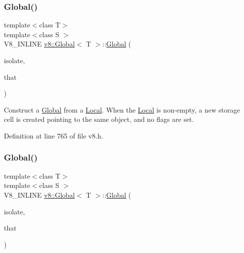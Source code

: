 \subsubsection{\texorpdfstring{Global()}{Global()}\hspace{0.1cm}{\footnotesize\ttfamily [2/4]}}
{\footnotesize\ttfamily template$<$class T$>$ \\
template$<$class S $>$ \\
V8\+\_\+\+I\+N\+L\+I\+NE \mbox{\hyperlink{classv8_1_1Global}{v8\+::\+Global}}$<$ T $>$\+::\mbox{\hyperlink{classv8_1_1Global}{Global}} (\begin{DoxyParamCaption}\item[{Isolate $\ast$}]{isolate,  }\item[{\mbox{\hyperlink{classv8_1_1Local}{Local}}$<$ S $>$}]{that }\end{DoxyParamCaption})\hspace{0.3cm}{\ttfamily [inline]}}

Construct a \mbox{\hyperlink{classv8_1_1Global}{Global}} from a \mbox{\hyperlink{classv8_1_1Local}{Local}}. When the \mbox{\hyperlink{classv8_1_1Local}{Local}} is non-\/empty, a new storage cell is created pointing to the same object, and no flags are set. 

Definition at line 765 of file v8.\+h.

\mbox{\label{classv8_1_1Global_a6243ecb28bb97d066065796fa28f7415}} 
\subsubsection{\texorpdfstring{Global()}{Global()}\hspace{0.1cm}{\footnotesize\ttfamily [3/4]}}
{\footnotesize\ttfamily template$<$class T$>$ \\
template$<$class S $>$ \\
V8\+\_\+\+I\+N\+L\+I\+NE \mbox{\hyperlink{classv8_1_1Global}{v8\+::\+Global}}$<$ T $>$\+::\mbox{\hyperlink{classv8_1_1Global}{Global}} (\begin{DoxyParamCaption}\item[{Isolate $\ast$}]{isolate,  }\item[{const \mbox{\hyperlink{classv8_1_1PersistentBase}{Persistent\+Base}}$<$ S $>$ \&}]{that }\end{DoxyParamCaption})\hspace{0.3cm}{\ttfamily [inline]}}

